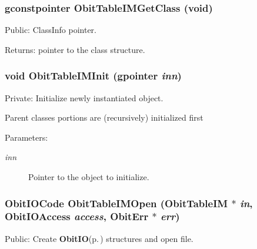 \subsubsection{\setlength{\rightskip}{0pt plus 5cm}gconstpointer Obit\-Table\-IMGet\-Class (void)}\label{ObitTableIM_8c_a17}


Public: Class\-Info pointer. 

\begin{Desc}
\item[Returns:]pointer to the class structure. \end{Desc}
\subsubsection{\setlength{\rightskip}{0pt plus 5cm}void Obit\-Table\-IMInit (gpointer {\em inn})}\label{ObitTableIM_8c_a8}


Private: Initialize newly instantiated object. 

Parent classes portions are (recursively) initialized first \begin{Desc}
\item[Parameters:]
\begin{description}
\item[{\em inn}]Pointer to the object to initialize. \end{description}
\end{Desc}
\subsubsection{\setlength{\rightskip}{0pt plus 5cm}Obit\-IOCode Obit\-Table\-IMOpen ({\bf Obit\-Table\-IM} $\ast$ {\em in}, Obit\-IOAccess {\em access}, {\bf Obit\-Err} $\ast$ {\em err})}\label{ObitTableIM_8c_a21}


Public: Create {\bf Obit\-IO}{\rm (p.\,\pageref{structObitIO})} structures and open file. 

